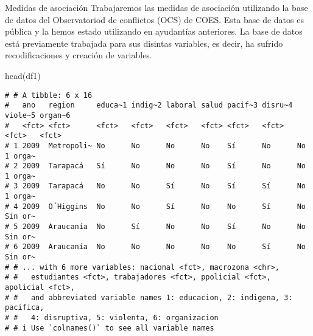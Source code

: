 \documentclass[
  8pt,
  ignorenonframetext,
]{beamer}
\newenvironment{Shaded}{\begin{snugshade}}{\end{snugshade}}
\newcommand{\FunctionTok}[1]{\textcolor[rgb]{0.00,0.00,0.00}{#1}}
\newcommand{\NormalTok}[1]{#1}
\begin{document}
\begin{frame}[fragile]{Medidas de asociación}
\protect\hypertarget{medidas-de-asociaciuxf3n}{}
Trabajaremos las medidas de asociación utilizando la base de datos del
Observatoriod de conflictos (OCS) de COES. Esta base de datos es pública
y la hemos estado utilizando en ayudantías anteriores. La base de datos
está previamente trabajada para sus disintas variables, es decir, ha
sufrido recodificaciones y creación de variables.

\begin{Shaded}
\begin{Highlighting}[]
\FunctionTok{head}\NormalTok{(df1)}
\end{Highlighting}
\end{Shaded}

\begin{verbatim}
# # A tibble: 6 x 16
#   ano   region     educa~1 indig~2 laboral salud pacif~3 disru~4 viole~5 organ~6
#   <fct> <fct>      <fct>   <fct>   <fct>   <fct> <fct>   <fct>   <fct>   <fct>  
# 1 2009  Metropoli~ No      No      No      No    Sí      No      No      1 orga~
# 2 2009  Tarapacá   Sí      No      No      No    Sí      No      No      1 orga~
# 3 2009  Tarapacá   No      No      Sí      No    Sí      Sí      No      1 orga~
# 4 2009  O´Higgins  No      No      Sí      No    No      Sí      No      Sin or~
# 5 2009  Araucanía  No      Sí      No      No    Sí      No      No      Sin or~
# 6 2009  Araucanía  No      No      No      No    No      Sí      No      Sin or~
# # ... with 6 more variables: nacional <fct>, macrozona <chr>,
# #   estudiantes <fct>, trabajadores <fct>, ppolicial <fct>, apolicial <fct>,
# #   and abbreviated variable names 1: educacion, 2: indigena, 3: pacifica,
# #   4: disruptiva, 5: violenta, 6: organizacion
# # i Use `colnames()` to see all variable names
\end{verbatim}
\end{frame}
\end{document}
